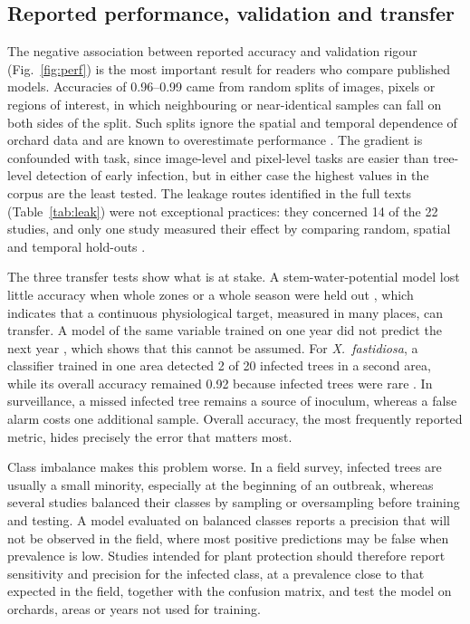 \documentclass[preprint,12pt]{elsarticle}
\begin{document}
\subsection{Reported performance, validation and transfer}\label{sec:disc_validation}
The negative association between reported accuracy and validation rigour (Fig.~\ref{fig:perf}) is the most important result for readers who compare published models. Accuracies of 0.96--0.99 came from random splits of images, pixels or regions of interest, in which neighbouring or near-identical samples can fall on both sides of the split. Such splits ignore the spatial and temporal dependence of orchard data and are known to overestimate performance \citep{roberts2017cv,ploton2020spatial,kapoor2023leakage}. The gradient is confounded with task, since image-level and pixel-level tasks are easier than tree-level detection of early infection, but in either case the highest values in the corpus are the least tested. The leakage routes identified in the full texts (Table~\ref{tab:leak}) were not exceptional practices: they concerned 14 of the 22 studies, and only one study measured their effect by comparing random, spatial and temporal hold-outs \citep{u133}.

The three transfer tests show what is at stake. A stem-water-potential model lost little accuracy when whole zones or a whole season were held out \citep{u133}, which indicates that a continuous physiological target, measured in many places, can transfer. A model of the same variable trained on one year did not predict the next year \citep{u081}, which shows that this cannot be assumed. For \textit{X.~fastidiosa}, a classifier trained in one area detected 2 of 20 infected trees in a second area, while its overall accuracy remained 0.92 because infected trees were rare \citep{u113}. In surveillance, a missed infected tree remains a source of inoculum, whereas a false alarm costs one additional sample. Overall accuracy, the most frequently reported metric, hides precisely the error that matters most.

Class imbalance makes this problem worse. In a field survey, infected trees are usually a small minority, especially at the beginning of an outbreak, whereas several studies balanced their classes by sampling or oversampling before training and testing. A model evaluated on balanced classes reports a precision that will not be observed in the field, where most positive predictions may be false when prevalence is low. Studies intended for plant protection should therefore report sensitivity and precision for the infected class, at a prevalence close to that expected in the field, together with the confusion matrix, and test the model on orchards, areas or years not used for training.
\end{document}
